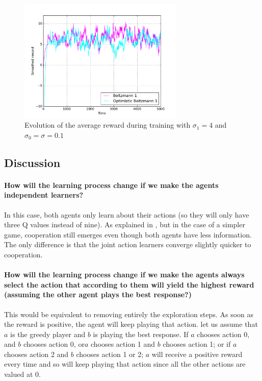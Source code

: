 \documentclass[a4paper]{article}
\begin{document}
\begin{figure}[H]
	\centering
	\includegraphics[width=0.7\textwidth]{./fig/ex2-2.pdf}
	\caption{Evolution of the average reward during training with
		$\sigma_1 = 4$ and  $\sigma_0 = \sigma = 0.1$}
	\label{ex33perf}
\end{figure}

\subsection{Discussion}

\paragraph{How will the learning process change if we make the agents 
independent learners?}
In this case, both agents only learn about their actions (so they will only have
three Q values instead of nine). As explained in \cite{claus}, but in the case of 
a simpler game, cooperation still emerges even though both agents have less
information. The only difference is that the joint action learners converge
slightly quicker to cooperation.

\paragraph{How will the learning process change if we make the agents always
select the action that according to them will yield the highest reward
(assuming the other agent plays the best response?)}
This would be equivalent to removing entirely the exploration steps. As soon as
the reward is positive, the agent will keep playing that action.
let us assume that $a$ is the greedy player and $b$ is playing the best
response. If $a$ chooses action 0, and $b$ chooses action 0, or$a$
chooses action 1 and $b$ chooses action 1; or if $a$ chooses action 2 and $b$ 
chooses action 1 or 2; $a$ will receive a positive reward every time and so 
will keep playing that action since all the other actions are valued at 0.
\end{document}
